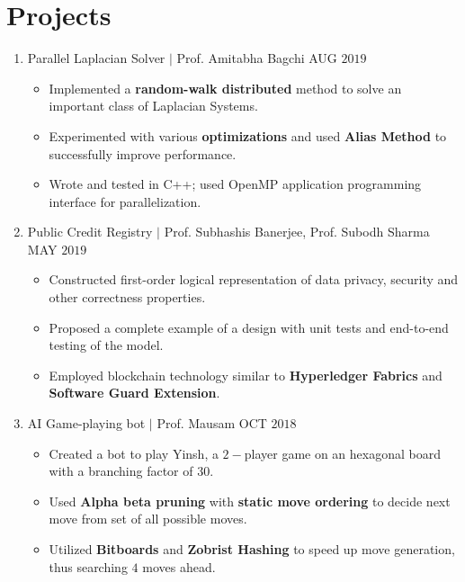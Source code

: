 \documentclass{article}
\begin{document}
\section*{Projects}
\begin{enumerate}
\item
    Parallel Laplacian Solver
    $\mid$
    Prof. Amitabha Bagchi
    \hfill
    AUG $2019$

    \begin{itemize}[noitemsep,nolistsep]
        \item
            Implemented a \textbf{random-walk distributed} method to solve an
            important class of Laplacian Systems.
        \item
            Experimented with various \textbf{optimizations} and used
            \textbf{Alias Method} to successfully improve performance.
        \item
            Wrote and tested in C++; used OpenMP application programming
            interface for parallelization.
    \end{itemize}

\item
    Public Credit Registry
    $\mid$
    Prof. Subhashis Banerjee, Prof. Subodh Sharma
    \hfill
    MAY $2019$

    \begin{itemize}[noitemsep,nolistsep]
        \item
            Constructed first-order logical representation of data
            privacy, security and other correctness properties.
        \item
            Proposed a complete example of a design with unit tests and
            end-to-end testing of the model.
        \item
            Employed blockchain technology similar to \textbf{Hyperledger
            Fabrics} and \textbf{Software Guard Extension}.
    \end{itemize}

\item
    AI Game-playing bot
    $\mid$
    Prof. Mausam
    \hfill
    OCT $2018$

    \begin{itemize}[noitemsep,nolistsep]
        \item
            Created a bot to play Yinsh, a $2-$player game on an hexagonal board
            with a branching factor of $30$.
        \item
            Used \textbf{Alpha beta pruning} with \textbf{static move ordering}
            to decide next move from set of all possible moves.
        \item
            Utilized \textbf{Bitboards} and \textbf{Zobrist Hashing} to speed up
            move generation, thus searching $4$ moves ahead.
    \end{itemize}


\end{enumerate}
\end{document}
